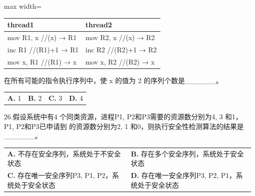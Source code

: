\documentclass[UTF8,11pt]{ctexart}
\begin{document}
\begin{center}\begin{adjustbox}{max width=\linewidth}\begin{tabular}{|>{\raggedright\arraybackslash}p{\dimexpr(\linewidth-4\tabcolsep-3\arrayrulewidth)/2\relax}|>{\raggedright\arraybackslash}p{\dimexpr(\linewidth-4\tabcolsep-3\arrayrulewidth)/2\relax}|}\hline
thread1 & thread2\\\hline
mov R1, x    //(x) \allowbreak{}→\allowbreak{} R1 & mov R2, x    //(x) \allowbreak{}→\allowbreak{} R2\\\hline
inc R1       //(R1)+1 \allowbreak{}→\allowbreak{} R1 & inc R2       //(R2)+1 \allowbreak{}→\allowbreak{} R2\\\hline
mov x, R1    //(R1) \allowbreak{}→\allowbreak{} x & mov x, R2    //(R2) \allowbreak{}→\allowbreak{} x\\\hline\end{tabular}\end{adjustbox}\end{center}

在所有可能的指令执行序列中，使 x 的值为 2 的序列个数是\_\_\_\_\_\_。


\begin{center}\begin{tabular}{>{\raggedright\arraybackslash}p{\dimexpr(\linewidth-8\tabcolsep)/4\relax}>{\raggedright\arraybackslash}p{\dimexpr(\linewidth-8\tabcolsep)/4\relax}>{\raggedright\arraybackslash}p{\dimexpr(\linewidth-8\tabcolsep)/4\relax}>{\raggedright\arraybackslash}p{\dimexpr(\linewidth-8\tabcolsep)/4\relax}}
\textbf{A.} 1 & \textbf{B.} 2 & \textbf{C.} 3 & \textbf{D.} 4\\[.35em]\end{tabular}\end{center}

26.假设系统中有4 个同类资源，进程P1, P2和P3需要的资源数分别为4, 3 和1，P1, P2和P3已申请到 的资源数分别为2, 1 和0，则执行安全性检测算法的结果是\_\_\_\_\_\_。


\begin{center}\begin{tabular}{>{\raggedright\arraybackslash}p{\dimexpr(\linewidth-4\tabcolsep)/2\relax}>{\raggedright\arraybackslash}p{\dimexpr(\linewidth-4\tabcolsep)/2\relax}}
\textbf{A.} 不存在安全序列，系统处于不安全状态 & \textbf{B.} 存在多个安全序列，系统处于安全状态\\[.35em]
\textbf{C.} 存在唯一安全序列P3, P1, P2，系统处于安全状态 & \textbf{D.} 存在唯一安全序列P3, P2, P1，系统处于安全状态\\[.35em]\end{tabular}\end{center}
\end{document}
